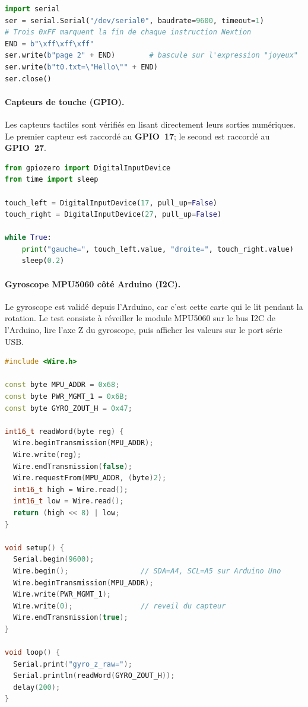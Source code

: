 \documentclass[a4paper,12pt]{report}
\begin{document}
\begin{lstlisting}[style=kodatest, language=Python, caption={Changer la page affichee par le Nextion}]
import serial
ser = serial.Serial("/dev/serial0", baudrate=9600, timeout=1)
# Trois 0xFF marquent la fin de chaque instruction Nextion
END = b"\xff\xff\xff"
ser.write(b"page 2" + END)        # bascule sur l'expression "joyeux"
ser.write(b"t0.txt=\"Hello\"" + END)
ser.close()
\end{lstlisting}

	\paragraph{Capteurs de touche (GPIO).}
	Les capteurs tactiles sont vérifiés en lisant directement leurs sorties
	numériques. Le premier capteur est raccordé au \textbf{GPIO~17}; le second
	est raccordé au \textbf{GPIO~27}.

\begin{lstlisting}[style=kodatest, language=Python, caption={Lecture des capteurs de touche sur GPIO}]
from gpiozero import DigitalInputDevice
from time import sleep

touch_left = DigitalInputDevice(17, pull_up=False)
touch_right = DigitalInputDevice(27, pull_up=False)

while True:
    print("gauche=", touch_left.value, "droite=", touch_right.value)
    sleep(0.2)
\end{lstlisting}

	\paragraph{Gyroscope MPU5060 côté Arduino (I2C).}
	Le gyroscope est validé depuis l'Arduino, car c'est cette carte qui le lit
	pendant la rotation. Le test consiste à réveiller le module MPU5060 sur le bus
	I2C de l'Arduino, lire l'axe Z du gyroscope, puis afficher les valeurs sur le
	port série USB.

\begin{lstlisting}[style=kodatest, language=C++, caption={Lecture du MPU5060 par l'Arduino via I2C}]
#include <Wire.h>

const byte MPU_ADDR = 0x68;
const byte PWR_MGMT_1 = 0x6B;
const byte GYRO_ZOUT_H = 0x47;

int16_t readWord(byte reg) {
  Wire.beginTransmission(MPU_ADDR);
  Wire.write(reg);
  Wire.endTransmission(false);
  Wire.requestFrom(MPU_ADDR, (byte)2);
  int16_t high = Wire.read();
  int16_t low = Wire.read();
  return (high << 8) | low;
}

void setup() {
  Serial.begin(9600);
  Wire.begin();                 // SDA=A4, SCL=A5 sur Arduino Uno
  Wire.beginTransmission(MPU_ADDR);
  Wire.write(PWR_MGMT_1);
  Wire.write(0);                // reveil du capteur
  Wire.endTransmission(true);
}

void loop() {
  Serial.print("gyro_z_raw=");
  Serial.println(readWord(GYRO_ZOUT_H));
  delay(200);
}
\end{lstlisting}
\end{document}
